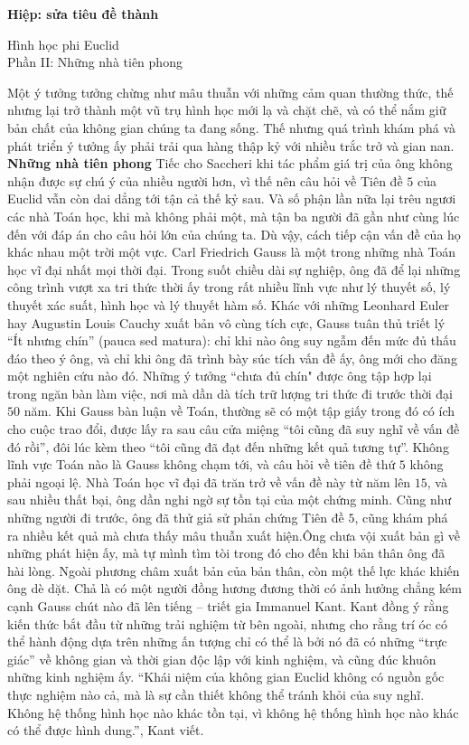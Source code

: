 \textbf{Hiệp: sửa tiêu đề thành}

{Hình học phi Euclid\\
Phần II: Những nhà tiên phong}


\begin{multicols}{2}
	Một ý tưởng tưởng chừng như mâu thuẫn với những cảm quan thường thức, thế nhưng lại trở thành một vũ trụ hình học mới lạ và chặt chẽ, và có thể nắm giữ bản chất của không gian chúng ta đang sống. Thế nhưng quá trình khám phá và phát triển ý tưởng ấy phải trải qua hàng thập kỷ với nhiều trắc trở và gian nan.
	\vskip 0.1cm
	\textbf{\color{lichsutoanhoc}Những nhà tiên phong}
	\vskip 0.1cm
	Tiếc cho Saccheri khi tác phẩm giá trị của ông không nhận được sự chú ý của nhiều người hơn, vì thế nên câu hỏi về Tiên đề $5$ của Euclid vẫn còn dai dẳng tới tận cả thế kỷ sau. Và số phận lần nữa lại trêu ngươi các nhà Toán học, khi mà không phải một, mà tận ba người đã gần như cùng lúc đến với đáp án cho câu hỏi lớn của chúng ta. Dù vậy, cách tiếp cận vấn đề của họ khác nhau một trời một vực.
	\vskip 0.1cm
	Carl Friedrich Gauss là một trong những nhà Toán học vĩ đại nhất mọi thời đại. Trong suốt chiều dài sự nghiệp, ông đã để lại những công trình vượt xa tri thức thời ấy trong rất nhiều lĩnh vực như lý thuyết số, lý thuyết xác suất, hình học và lý thuyết hàm số. Khác với những Leonhard Euler hay Augustin Louis Cauchy xuất bản vô cùng tích cực, Gauss tuân thủ triết lý ``Ít nhưng chín'' (pauca sed matura): chỉ khi nào ông suy ngẫm đến mức đủ thấu đáo theo ý ông, và chỉ khi ông đã trình bày súc tích vấn đề ấy, ông mới cho đăng một nghiên cứu nào đó. Những ý tưởng ``chưa đủ chín" được ông tập hợp lại trong ngăn bàn làm việc, nơi mà dần dà tích trữ lượng tri thức đi trước thời đại $50$ năm. Khi Gauss bàn luận về Toán, thường sẽ có một tập giấy trong đó có ích cho cuộc trao đổi, được lấy ra sau câu cửa miệng ``tôi cũng đã suy nghĩ về vấn đề đó rồi'', đôi lúc kèm theo ``tôi cũng đã đạt đến những kết quả tương tự''.
	\vskip 0.1cm
	Không lĩnh vực Toán nào là Gauss không chạm tới, và câu hỏi về tiên đề thứ $5$ không phải ngoại lệ. Nhà Toán học vĩ đại đã trăn trở về vấn đề này từ năm lên $15$, và sau nhiều thất bại, ông dần nghi ngờ sự tồn tại của một chứng minh. Cũng như những người đi trước, ông đã thử giả sử phản chứng Tiên đề $5$, cũng khám phá ra nhiều kết quả mà chưa thấy mâu thuẫn xuất hiện.Ông chưa vội xuất bản gì về những phát hiện ấy, mà tự mình tìm tòi trong đó cho đến khi bản thân ông đã hài lòng. Ngoài phương châm xuất bản của bản thân, còn một thế lực khác khiến ông dè dặt. Chả là có một người đồng hương đương thời có ảnh hưởng chẳng kém cạnh Gauss chút nào đã lên tiếng -- triết gia Immanuel Kant. Kant đồng ý rằng kiến thức bắt đầu từ những trải nghiệm từ bên ngoài, nhưng cho rằng trí óc có thể hành động dựa trên những ấn tượng chỉ có thể là bởi nó đã có những ``trực giác'' về không gian và thời gian độc lập với kinh nghiệm, và cũng đúc khuôn những kinh nghiệm ấy. ``Khái niệm của không gian Euclid không có nguồn gốc thực nghiệm nào cả, mà là sự cần thiết không thể tránh khỏi của suy nghĩ. Không hệ thống hình học nào khác tồn tại, vì không hệ thống hình học nào khác có thể được hình dung.'', Kant viết.

\end{multicols}
